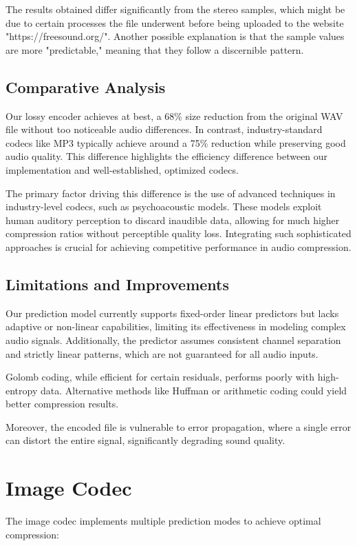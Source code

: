 \documentclass[a4paper,14pt]{article}
\begin{document}
The results obtained differ significantly from the stereo samples, which might be due to certain processes the file underwent before being uploaded to the website "https://freesound.org/". Another possible explanation is that the sample values are more "predictable," meaning that they follow a discernible pattern.


\subsection{Comparative Analysis}
Our lossy encoder achieves at best, a 68\% size reduction from the original WAV file without too noticeable audio differences. In contrast, industry-standard codecs like MP3 typically achieve around a 75\% reduction while preserving good audio quality. This difference highlights the efficiency difference between our implementation and well-established, optimized codecs. 

The primary factor driving this difference is the use of advanced techniques in industry-level codecs, such as psychoacoustic models. These models exploit human auditory perception to discard inaudible data, allowing for much higher compression ratios without perceptible quality loss. Integrating such sophisticated approaches is crucial for achieving competitive performance in audio compression.



\subsection{Limitations and Improvements}
Our prediction model currently supports fixed-order linear predictors but lacks adaptive or non-linear capabilities, limiting its effectiveness in modeling complex audio signals. Additionally, the predictor assumes consistent channel separation and strictly linear patterns, which are not guaranteed for all audio inputs.

Golomb coding, while efficient for certain residuals, performs poorly with high-entropy data. Alternative methods like Huffman or arithmetic coding could yield better compression results.

Moreover, the encoded file is vulnerable to error propagation, where a single error can distort the entire signal, significantly degrading sound quality.


\section{Image Codec}
The image codec implements multiple prediction modes to achieve optimal compression:
\end{document}
